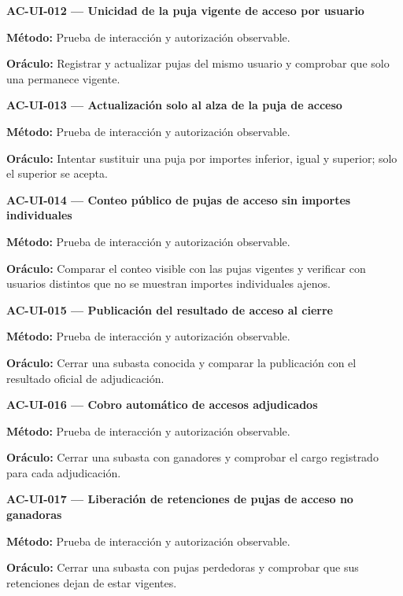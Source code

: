 \documentclass[10pt,letterpaper]{article}
\begin{document}
\noindent\textbf{AC-UI-012 --- Unicidad de la puja vigente de acceso por usuario}\par
\textbf{Método:} Prueba de interacción y autorización observable.\par
\textbf{Oráculo:} Registrar y actualizar pujas del mismo usuario y comprobar que solo una permanece vigente.\par\vspace{0.45em}
\noindent\textbf{AC-UI-013 --- Actualización solo al alza de la puja de acceso}\par
\textbf{Método:} Prueba de interacción y autorización observable.\par
\textbf{Oráculo:} Intentar sustituir una puja por importes inferior, igual y superior; solo el superior se acepta.\par\vspace{0.45em}
\noindent\textbf{AC-UI-014 --- Conteo público de pujas de acceso sin importes individuales}\par
\textbf{Método:} Prueba de interacción y autorización observable.\par
\textbf{Oráculo:} Comparar el conteo visible con las pujas vigentes y verificar con usuarios distintos que no se muestran importes individuales ajenos.\par\vspace{0.45em}
\noindent\textbf{AC-UI-015 --- Publicación del resultado de acceso al cierre}\par
\textbf{Método:} Prueba de interacción y autorización observable.\par
\textbf{Oráculo:} Cerrar una subasta conocida y comparar la publicación con el resultado oficial de adjudicación.\par\vspace{0.45em}
\noindent\textbf{AC-UI-016 --- Cobro automático de accesos adjudicados}\par
\textbf{Método:} Prueba de interacción y autorización observable.\par
\textbf{Oráculo:} Cerrar una subasta con ganadores y comprobar el cargo registrado para cada adjudicación.\par\vspace{0.45em}
\noindent\textbf{AC-UI-017 --- Liberación de retenciones de pujas de acceso no ganadoras}\par
\textbf{Método:} Prueba de interacción y autorización observable.\par
\textbf{Oráculo:} Cerrar una subasta con pujas perdedoras y comprobar que sus retenciones dejan de estar vigentes.\par\vspace{0.45em}
\end{document}
